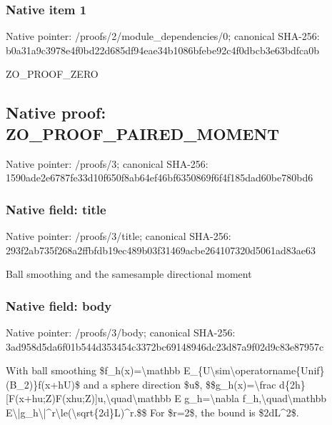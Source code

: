 \documentclass[10pt,a4paper]{article}
\begin{document}
\subsubsection{Native item 1}


Native pointer: /proofs/2/module\_dependencies/0; canonical SHA-256: b0a31a9c3978e4f0bd22d685\allowbreak{}df94eae34b1086bfebe92c4f\allowbreak{}0dbcb3e63bdfca0b


ZO\_PROOF\_ZERO


\subsection{Native proof: ZO\_PROOF\_PAIRED\_MOMENT}


Native pointer: /proofs/3; canonical SHA-256: 1590ade2e6787fe33d10f650\allowbreak{}f8ab64ef46bf6350869f6f4f\allowbreak{}185dad60be780bd6



\subsubsection{Native field: title}


Native pointer: /proofs/3/title; canonical SHA-256: 293f2ab735f268a2ffbfdb19\allowbreak{}ec489b03f31469acbe264107\allowbreak{}320d5061ad83ae63


Ball smoothing and the samesample directional moment


\subsubsection{Native field: body}


Native pointer: /proofs/3/body; canonical SHA-256: 3ad958d5da6f01b544d35345\allowbreak{}4c3372bc69148946dc23d87a\allowbreak{}9f02d9c83e87957c


With ball smoothing \$f\_h(x)=\textbackslash{}mathbb E\_\{U\textbackslash{}sim\textbackslash{}operatorname\{Un\allowbreak{}if\}(B\_2)\}f(x+hU)\$ and a sphere direction \$u\$,
\$\$g\_h(x)=\textbackslash{}frac d\{2h\}[F(x+hu;Z)F(xhu;Z\allowbreak{})]u,\textbackslash{}quad\textbackslash{}mathbb E g\_h=\textbackslash{}nabla f\_h,\textbackslash{}quad\textbackslash{}mathbb E\textbackslash{}|g\_h\textbackslash{}|\textasciicircum{}r\textbackslash{}le(\textbackslash{}sqrt\{2d\}L)\textasciicircum{}r.\$\$
For \$r=2\$, the bound is \$2dL\textasciicircum{}2\$.
\end{document}
